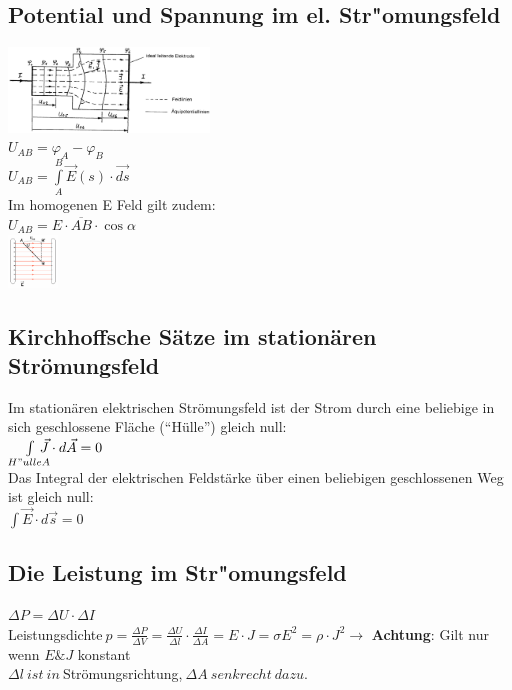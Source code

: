 \subsection{Potential und Spannung im el. Str"omungsfeld}
\begin{multicols}{2}
\includegraphics[width=0.4\textwidth]{pics/stroemungsfeld/feldlinien}\\
$ U_{AB} = \varphi_A - \varphi_B $\\
$ U_{AB} = \int\limits_{A}^B \vec E (s) \cdot  \vec{ds} $ \\
Im homogenen E Feld gilt zudem: \\
$ U_{AB} = E \cdot \overline{AB} \cdot \cos\alpha $ \\
\includegraphics[width=0.1\textwidth]{pics/stroemungsfeld/potential}\\
\end{multicols}

\subsection{Kirchhoffsche Sätze im stationären Strömungsfeld}
Im stationären elektrischen Strömungsfeld ist der Strom durch eine beliebige in sich geschlossene Fläche ("`Hülle"') gleich null:\\
$ \int\limits_{H"ulle A} \hspace{-10pt}\vec J \cdot d \vec A = 0 $\\[10pt]
Das Integral der elektrischen Feldstärke über einen beliebigen geschlossenen Weg ist gleich null:\\
$ \int \vec E \cdot d \vec s = 0 $\\[10pt]

\subsection{Die Leistung im Str"omungsfeld}
$ \Delta P = \Delta U \cdot \Delta I $\\[10pt]
Leistungsdichte$\ p = \frac{\Delta P}{\Delta V} = \frac{\Delta U }{\Delta l} \cdot \frac{\Delta I}{\Delta A} = E \cdot J = \sigma E^2 = \rho \cdot J^2 \rightarrow$ \textbf{Achtung}: Gilt nur wenn $E \& J$ konstant\\[10pt]
$ \Delta{l} \ ist\ in\ $Strömungsrichtung,$\ \Delta{A} \ senkrecht\ dazu.$\\



